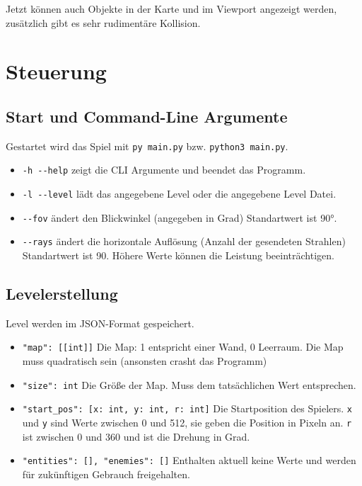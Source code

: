 \documentclass[a4paper,titlepage]{article}
\begin{document}
Jetzt können auch Objekte in der Karte und im Viewport angezeigt werden, zusätzlich gibt es sehr rudimentäre Kollision.

\newpage

\section{Steuerung}

\subsection{Start und Command-Line Argumente}

Gestartet wird das Spiel mit \verb|py main.py| bzw. \verb|python3 main.py|.

\begin{itemize}
	\item \verb|-h --help| zeigt die CLI Argumente und beendet das Programm.
	\item \verb|-l --level| lädt das angegebene Level oder die angegebene Level Datei.
	\item \verb|--fov| ändert den Blickwinkel (angegeben in Grad) Standartwert ist 90°.
	\item \verb|--rays| ändert die horizontale Auflösung (Anzahl der gesendeten Strahlen) Standartwert ist 90. Höhere Werte können die Leistung beeinträchtigen.
\end{itemize}

\subsection{Levelerstellung}
Level werden im JSON-Format gespeichert.
\begin{itemize}
	\item \verb|"map": [[int]]| Die Map: 1 entspricht einer Wand, 0 Leerraum. Die Map muss quadratisch sein (ansonsten crasht das Programm)
	\item \verb|"size": int| Die Größe der Map. Muss dem tatsächlichen Wert entsprechen.
	\item \verb|"start_pos": [x: int, y: int, r: int]| Die Startposition des Spielers. \verb|x| und \verb|y| sind Werte zwischen 0 und 512, sie geben die Position in Pixeln an. \verb|r| ist zwischen 0 und 360 und ist die Drehung in Grad.
	\item \verb|"entities": [], "enemies": []| Enthalten aktuell keine Werte und werden für zukünftigen Gebrauch freigehalten.
	
\end{itemize}
\end{document}
